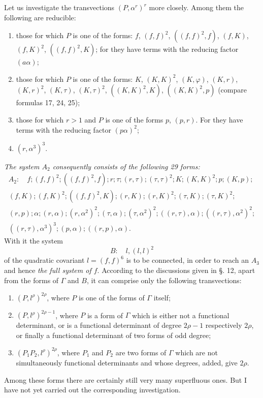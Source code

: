 \documentclass[10pt]{article}
\begin{document}
Let us investigate the transvections $(P,\alpha^r)^r$ more closely. Among them the following are reducible:
\begin{enumerate}
\item those for which $P$ is one of the forms: $f$, $(f,f)^2$, $((f,f)^2,f)$, $(f,K)$, $(f,K)^2$, $((f,f)^2,K)$; for they have terms with the reducing factor $(a\alpha)$;
\item those for which $P$ is one of the forms: $K$, $(K,K)^2$, $(K,\varphi)$, $(K,r)$, $(K,r)^2$, $(K,\tau)$, $(K,\tau)^2$, $((K,K)^2,K)$, $((K,K)^2,p)$ (compare formulas 17, 24, 25);
\item those for which $r>1$ and $P$ is one of the forms $p$, $(p,r)$. For they have terms with the reducing factor $(p\alpha)^2$;
\item $(r,\alpha^3)^3$.
\end{enumerate}
\textit{The system $A_2$ consequently consists of the following 29 forms:}
\[
\begin{gathered}
A_2:
\quad f;(f,f)^2;((f,f)^2,f);r;\tau;(r,\tau);(\tau,\tau)^2;K;(K,K)^2;p;(K,p);\\
(f,K);(f,K)^2;((f,f)^2,K);(r,K);(r,K)^2;(\tau,K);(\tau,K)^2;\\
(r,p);\alpha;(r,\alpha);(r,\alpha^2)^2;(\tau,\alpha);(\tau,\alpha^2)^2;((r,\tau),\alpha);((r,\tau),\alpha^2)^2;\\
((r,\tau),\alpha^3)^3;(p,\alpha);((r,p),\alpha).
\end{gathered}
\]
With it the system
\[
B:
\quad l,(l,l)^2
\]
of the quadratic covariant $l=(f,f)^6$ is to be connected, in order to reach an $A_3$ and hence \textit{the full system of $f$}. According to the discussions given in §. 12, apart from the forms of $\Gamma$ and $B$, it can comprise only the following transvections:
\begin{enumerate}
\item[I.] $(P,l^\rho)^{2\rho}$, where $P$ is one of the forms of $\Gamma$ itself;
\item[II.] $(P,l^\rho)^{2\rho-1}$, where $P$ is a form of $\Gamma$ which is either not a functional determinant, or is a functional determinant of degree $2\rho-1$ respectively $2\rho$, or finally a functional determinant of two forms of odd degree;
\item[III.] $(P_1P_2,l^\rho)^{2\rho}$, where $P_1$ and $P_2$ are two forms of $\Gamma$ which are not simultaneously functional determinants and whose degrees, added, give $2\rho$.
\end{enumerate}
Among these forms there are certainly still very many superfluous ones. But I have not yet carried out the corresponding investigation.
\end{document}
